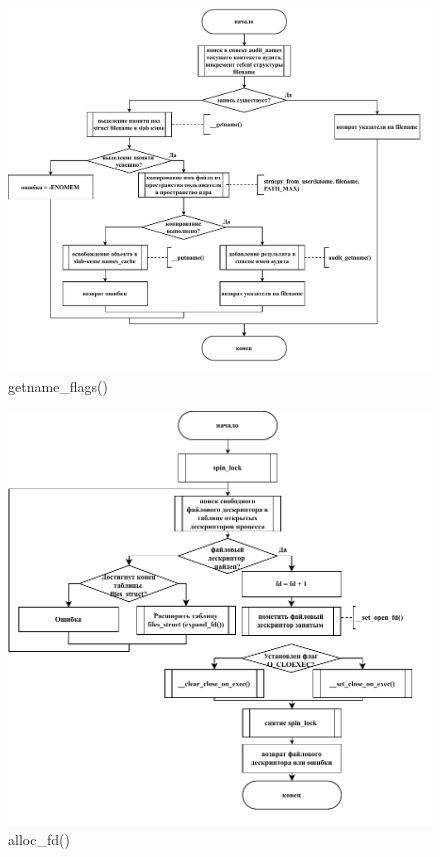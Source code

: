 \begin{figure}[ht]
	\centering
	\includegraphics[width=\textwidth]{img/getname_flags.pdf}
	\caption{getname\_flags()}
\end{figure}

\begin{figure}[ht]
	\centering
	\includegraphics[width=\textwidth]{img/alloc_fd.pdf}
	\caption{alloc\_fd()}
\end{figure}

